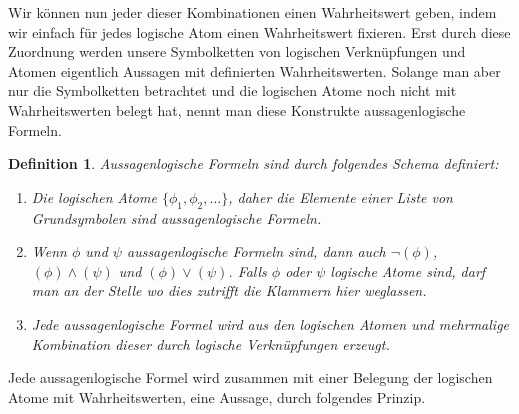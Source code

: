 \documentclass[11pt,a4paper,leqno]{report}
\newtheorem{definition}[theorem]{Definition}
\numberwithin{equation}{chapter}
\begin{document}
Wir können nun jeder dieser Kombinationen einen Wahrheitswert geben, indem wir einfach für jedes logische Atom einen Wahrheitswert fixieren.
Erst durch diese Zuordnung werden unsere Symbolketten von logischen Verknüpfungen und Atomen eigentlich Aussagen mit definierten Wahrheitswerten.
Solange man aber nur die Symbolketten betrachtet und die logischen Atome noch nicht mit Wahrheitswerten belegt hat, nennt man diese Konstrukte aussagenlogische Formeln.
\begin{definition}
	Aussagenlogische Formeln sind durch folgendes Schema definiert:
	\begin{enumerate}
		\item Die logischen Atome $\{\phi_1, \phi_2, \dots\}$, daher die Elemente einer Liste von Grundsymbolen sind aussagenlogische Formeln.
		\item Wenn $\phi$ und $\psi$ aussagenlogische Formeln sind, dann auch $\neg(\phi)$, $(\phi)\wedge(\psi)$ und $(\phi)\vee(\psi)$. Falls $\phi$ oder $\psi$ logische Atome sind, darf man an der Stelle wo dies zutrifft die Klammern hier weglassen.
		\item Jede aussagenlogische Formel wird aus den logischen Atomen und mehrmalige Kombination dieser durch logische Verknüpfungen erzeugt.
	\end{enumerate}
	
\end{definition}
Jede aussagenlogische Formel wird zusammen mit einer Belegung der logischen Atome mit Wahrheitswerten, eine Aussage, durch folgendes Prinzip.
\end{document}
